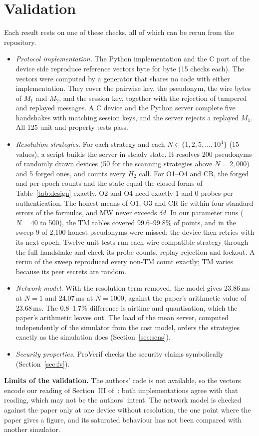 \section{Validation}\label{sec:validation}
Each result rests on one of these checks, all of which can be rerun from the repository.
\begin{itemize}
\item \emph{Protocol implementation.} The Python implementation and the C port of the device side reproduce reference
vectors byte for byte (15 checks each). The vectors were computed by a generator that shares no code with either
implementation. They cover the pairwise key, the pseudonym, the wire bytes of $M_1$ and $M_2$, and the session key,
together with the rejection of tampered and replayed messages. A C device and the Python server complete five handshakes
with matching session keys, and the server rejects a replayed $M_1$. All 125 unit and property tests pass.
\item \emph{Resolution strategies.} For each strategy and each $N\in\{1,2,5,\dots,10^4\}$ (15 values), a script builds the
server in steady state. It resolves 200 pseudonyms of randomly drawn devices (50 for the scanning strategies above
$N=2{,}000$) and 5 forged ones, and counts every $H_2$ call. For O1--O4 and CR, the forged and per-epoch counts and the
state equal the closed forms of Table~\ref{tab:design} exactly. O2 and O4 need exactly 1 and 0 probes per
authentication. The honest means of O1, O3 and CR lie within four standard errors of the formulas, and MW never exceeds
$\delta d$. In our parameter runs ($N=40$ to 500), the TM tables covered 99.6--99.8\% of points, and in the sweep 9 of
2{,}100 honest pseudonyms were missed; the device then retries with its next epoch. Twelve unit tests run each
wire-compatible strategy through the full handshake and check its probe counts, replay rejection and lockout. A rerun of
the sweep reproduced every non-TM count exactly; TM varies because its peer secrets are random.
\item \emph{Network model.} With the resolution term removed, the model gives 23.86\,ms at $N=1$ and 24.07\,ms at
$N=1000$, against the paper's arithmetic value of 23.68\,ms. The 0.8--1.7\% difference is airtime and quantisation, which
the paper's arithmetic leaves out. The load of the mean server, computed independently of the simulator from the cost
model, orders the strategies exactly as the simulation does (Section~\ref{sec:sens}).
\iffv
\item \emph{Security properties.} ProVerif checks the security claims symbolically (Section~\ref{sec:fv}).
\fi
\end{itemize}
\textbf{Limits of the validation.} The authors' code is not available, so the vectors encode our reading of
Section~III of~\cite{base}: both implementations agree with that reading, which may not be the authors' intent. The
network model is checked against the paper only at one device without resolution, the one point where the paper gives a
figure, and its saturated behaviour has not been compared with another simulator.

